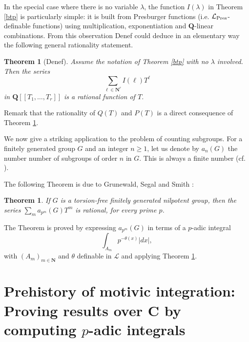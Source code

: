 \documentclass[english,12pt]{amsart}
\def\CC{{\mathbf C}}
\def\NN{{\mathbf N}}
\def\QQ{{\mathbf Q}}
\def\cL{{\mathcal L}}
\newtheorem{theorem}[subsubsection]{Theorem}
\theoremstyle{definition}
\theoremstyle{remark}
\theoremstyle{plain}
\numberwithin{equation}{subsection}
\def\CC{{\mathbf C}}
\def\NN{{\mathbf N}}
\def\QQ{{\mathbf Q}}
\def\cL{{\mathcal L}}
\begin{document}
In the special case where there is no variable $\lambda$,
the function $I (\lambda)$ in Theorem \ref{btp} is particularly simple:
it is built from Presburger functions (i.e. $\cL_{\rm Pres}$-definable functions)
using multiplication, exponentiation and $\QQ$-linear combinations.
From this observation Denef could deduce 
in an elementary way the following general rationality
statement.


\begin{theorem}[Denef]\label{grat}Assume the notation of Theorem \ref{btp} with no
$\lambda$ involved. Then
the series
$$
\sum_{\ell \in \NN^r}I (\ell) T^{\ell}
$$
in $\QQ [[T_1, \dots, T_r]]$ is a rational function of $T$.
\end{theorem}

Remark that the rationality of
$Q (T)$ and $P (T)$ is a direct consequence of Theorem \ref{grat}.


We now give a striking application to the problem of counting subgroups.
For a finitely generated group $G$ and an integer $n \geq 1$, 
let us denote by $a_n (G)$ the number 
number of subgroups of order $n$ in $G$. This is always
a finite number (cf. \cite{GSS}).

The following Theorem is due to 
Grunewald, Segal and Smith \cite{GSS}:
\begin{theorem}If $G$ is a torsion-free
finitely generated nilpotent group, then the series
$\sum_m a_{p^m} (G) T^m$
is rational, for every prime $p$.
\end{theorem}

The Theorem is proved by expressing $a_{p^m} (G) $ in terms of
a $p$-adic integral
$$\int_{A_m} p^{- \theta (x)} \vert dx \vert,$$
with $(A_m)_{m \in \NN}$ and $\theta$ definable in $\cL$ and applying 
Theorem \ref{grat}.





\section{Prehistory of motivic integration:
Proving results over $\CC$ by computing $p$-adic integrals}\label{prehistory}
\end{document}
